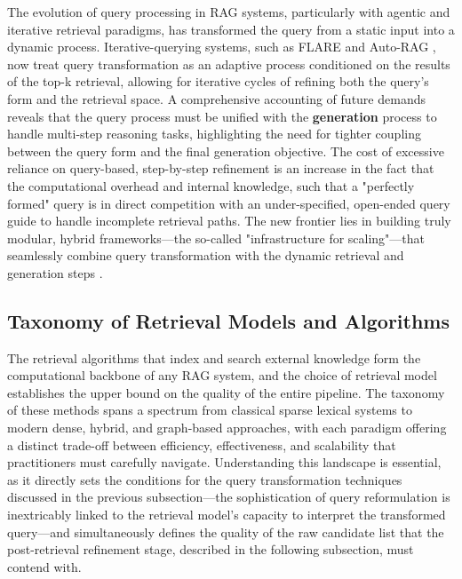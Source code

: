 \documentclass[11pt,a4paper]{article}
\begin{document}
The evolution of query processing in RAG systems, particularly with agentic and iterative retrieval paradigms, has transformed the query from a static input into a dynamic process. Iterative-querying systems, such as FLARE \cite{arxiv:2305.06983v2} and Auto-RAG \cite{arxiv:2411.19443v1}, now treat query transformation as an adaptive process conditioned on the results of the top-k retrieval, allowing for iterative cycles of refining both the query's form and the retrieval space. A comprehensive accounting of future demands reveals that the query process must be unified with the \textbf{generation} process to handle multi-step reasoning tasks, highlighting the need for tighter coupling between the query form and the final generation objective. The cost of excessive reliance on query-based, step-by-step refinement is an increase in the fact that the computational overhead and internal knowledge, such that a "perfectly formed" query is in direct competition with an under-specified, open-ended query guide to handle incomplete retrieval paths. The new frontier lies in building truly modular, hybrid frameworks---the so-called "infrastructure for scaling"---that seamlessly combine query transformation with the dynamic retrieval and generation steps \cite{arxiv:2310.11511v1,arxiv:2410.12837v1}.


\subsection{Taxonomy of Retrieval Models and Algorithms}


The retrieval algorithms that index and search external knowledge form the computational backbone of any RAG system, and the choice of retrieval model establishes the upper bound on the quality of the entire pipeline. The taxonomy of these methods spans a spectrum from classical sparse lexical systems to modern dense, hybrid, and graph-based approaches, with each paradigm offering a distinct trade-off between efficiency, effectiveness, and scalability that practitioners must carefully navigate. Understanding this landscape is essential, as it directly sets the conditions for the query transformation techniques discussed in the previous subsection---the sophistication of query reformulation is inextricably linked to the retrieval model's capacity to interpret the transformed query---and simultaneously defines the quality of the raw candidate list that the post-retrieval refinement stage, described in the following subsection, must contend with.
\end{document}

